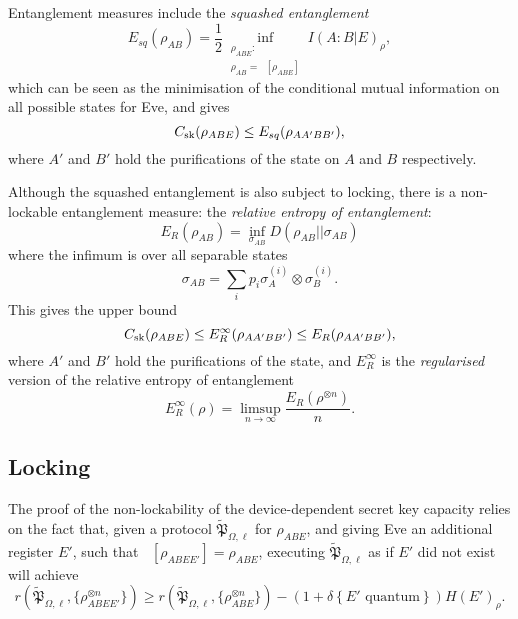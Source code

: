 \documentclass[10pt, a4paper]{article}
\numberwithin{equation}{section} %
\theoremstyle{definition}
\theoremstyle{plain}
\newcommand{\?}{\mathrel{?}} %
\newcommand{\indic}[1]{\delta{\left\{#1\right\}}} %
\newcommand{\Tr}[2][]{\mathop{\mathrm{Tr}#1}\left[ #2 \right]} %
\newcommand{\qproto}[2][_{\Omega,\ell}]{\tilde{\mathfrak{#2}}#1}
\newcommand{\sk}{\rm sk}
\begin{document}
    Entanglement measures include the \emph{squashed entanglement}
    \begin{equation}
      E_{sq}(\rho_{A B}) = \frac{1}{2} \inf_{\substack{\rho_{A BE} : \\ \rho_{A B} = \Tr[_E]{\rho_{A BE}}}} I(A:B|E)_{\rho},
    \end{equation}
    which can be seen as the minimisation of the conditional mutual information on all possible states for Eve, and gives
    \begin{equation}
      C_{\sk}(\rho_{A B E}) \leq E_{sq}(\rho_{A A' B B'}),
    \end{equation}
    where \(A'\) and \(B'\) hold the purifications of the state on \(A\) and \(B\) respectively.

    Although the squashed entanglement is also subject to locking, there is a non-lockable entanglement measure: the \emph{relative entropy of entanglement}:
    \begin{equation}
      E_R\left({\rho_{AB}}\right) = \inf_{\sigma_{AB}} D(\rho_{AB}||\sigma_{AB})
    \end{equation}
    where the infimum is over all separable states
    \begin{equation}
      \sigma_{AB} = \sum_i p_i \sigma_{A}^{(i)} \otimes \sigma_{B}^{(i)}.
    \end{equation}
    This gives the upper bound
    \begin{equation}
      C_{\sk}(\rho_{A B E}) \leq E_{R}^{\infty}(\rho_{A A' B B'}) \leq E_{R}(\rho_{A A' B B'}),
    \end{equation}
    where \(A'\) and \(B'\) hold the purifications of the state, and \(E_{R}^{\infty}\) is the \emph{regularised} version of the relative entropy of entanglement
    \begin{equation}
      E_{R}^{\infty}(\rho) = \limsup_{n\to\infty} \frac{E_R(\rho^{\otimes n})}{n}.
    \end{equation}

    \subsection{Locking}\label{sec:diqkd_lock}

    The proof of the non-lockability of the device-dependent secret key capacity relies on the fact that, given a protocol \(\qproto{P}\) for \(\rho_{ABE}\), and giving Eve an additional register \(E'\), such that \(\Tr[_{E'}]{\rho_{ABEE'}} = \rho_{ABE}\), executing \(\qproto{P}\) as if \(E'\) did not exist will achieve~\cite[Thm 5.1]{CQKeyDistill}
              \begin{equation}
                r\left(\qproto{P}, {\{\rho_{ABEE'}^{\otimes n}\}} \right) \geq r\left(\qproto{P}, {\{\rho_{ABE}^{\otimes n}\}} \right) - (1+\indic{E' \text{ quantum}})H{(E')}_{\rho}.
              \end{equation}
\end{document}
